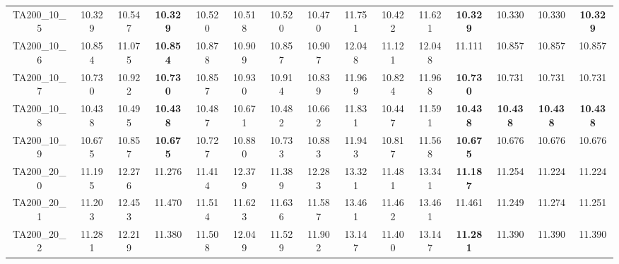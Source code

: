 \begin{tabular}{cc||ccccccccccccc}
TA200\_10\_5       & 10.329           & 10.547           & {\bf 10.329}     & 10.520           & 10.518           & 10.520           & 10.470           & 11.751           & 10.422           & 11.621           & {\bf 10.329}     & 10.330           & 10.330           & {\bf 10.329}    \\ 
TA200\_10\_6       & 10.854           & 11.075           & {\bf 10.854}     & 10.878           & 10.909           & 10.857           & 10.907           & 12.048           & 11.121           & 12.048           & 11.111           & 10.857           & 10.857           & 10.857          \\ 
TA200\_10\_7       & 10.730           & 10.922           & {\bf 10.730}     & 10.857           & 10.930           & 10.914           & 10.839           & 11.969           & 10.824           & 11.968           & {\bf 10.730}     & 10.731           & 10.731           & 10.731          \\ 
TA200\_10\_8       & 10.438           & 10.495           & {\bf 10.438}     & 10.487           & 10.671           & 10.482           & 10.662           & 11.831           & 10.447           & 11.591           & {\bf 10.438}     & {\bf 10.438}     & {\bf 10.438}     & {\bf 10.438}    \\ 
TA200\_10\_9       & 10.675           & 10.857           & {\bf 10.675}     & 10.727           & 10.880           & 10.733           & 10.883           & 11.943           & 10.817           & 11.568           & {\bf 10.675}     & 10.676           & 10.676           & 10.676          \\ 
TA200\_20\_0       & 11.195           & 12.276           & 11.276           & 11.414           & 12.379           & 11.389           & 12.283           & 13.321           & 11.481           & 13.341           & {\bf 11.187}     & 11.254           & 11.224           & 11.224          \\ 
TA200\_20\_1       & 11.203           & 12.453           & 11.470           & 11.514           & 11.623           & 11.636           & 11.587           & 13.461           & 11.462           & 13.461           & 11.461           & 11.249           & 11.274           & 11.251          \\ 
TA200\_20\_2       & 11.281           & 12.219           & 11.380           & 11.508           & 12.049           & 11.529           & 11.902           & 13.147           & 11.400           & 13.147           & {\bf 11.281}     & 11.390           & 11.390           & 11.390          \\ 

\end{tabular}
